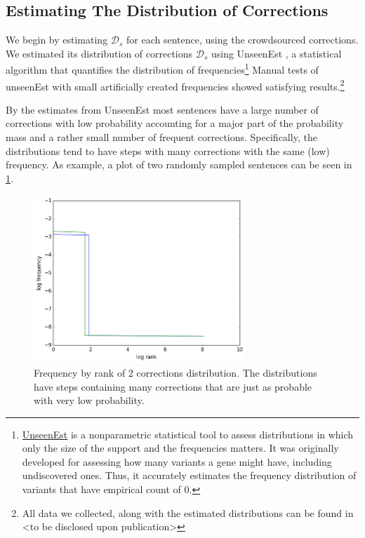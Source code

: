 \documentclass[letter,11pt]{article}
\begin{document}
\subsection{Estimating The Distribution of Corrections}

We begin by estimating $\mathcal{D}_s$ for each sentence, using the crowdsourced
corrections. We estimated its distribution of corrections $\mathcal{D}_s$
using {\sc UnseenEst} \cite{zou2015quantifying}, a statistical algorithm that quantifies
the distribution of frequencies\footnote{\href{https://github.com/borgr/unseenest}{UnseenEst} is a nonparametric statistical tool to assess distributions in which only the size of the support and the frequencies matters. It was originally developed for assessing how many variants a gene might have, including undiscovered ones. Thus, it accurately estimates the frequency distribution of variants that have empirical count of 0. } Manual tests of unseenEst with small artificially created frequencies showed
satisfying results.\footnote{All data
  we collected, along with the estimated distributions can be found in <to be disclosed
  upon publication>}

By the estimates from {\sc UnseenEst} most sentences have a large number of corrections with low probability accounting for a major part of the probability mass and a rather small number of frequent corrections. Specifically, the distributions tend to have steps with many corrections with the same (low) frequency. As example, a plot of two randomly sampled sentences can be seen in \ref{fig:corrections_dist}.

\begin{figure}
	\includegraphics[width = 8cm]{exact_dists_plot}
	\caption{Frequency by rank of 2 corrections distribution. The distributions have steps containing many corrections that are just as probable with very low probability. 	\label{fig:corrections_dist}}
\end{figure}
\end{document}
